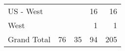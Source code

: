 \begin{table}[]
\begin{tabular}{@{}lrrrr@{}}
\multicolumn{1}{l|}{US - West}                                      &                                                             &                                                                       & 16                                                                   & 16                                                                 \\
\multicolumn{1}{l|}{West}                                           &                                                             &                                                                       & 1                                                                    & 1                                                                  \\ \midrule
Grand Total                                                         & 76                                                          & 35                                                                    & 94                                                                   & 205                                                                \\ \bottomrule
\end{tabular}
\end{table}
